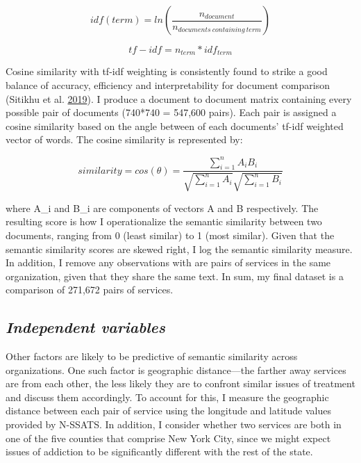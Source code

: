 \documentclass[
  12pt,
]{article}
\begin{document}
\vspace{12pt}

\[idf(term) = ln(\frac{n_{document}}{n_{documents\ containing\ term}})\]

\vspace{12pt}

\[tf-idf = n_{term} * idf_{term}\]

\vspace{12pt}

Cosine similarity with tf-idf weighting is consistently found to strike a good balance of accuracy, efficiency and interpretability for document comparison (Sitikhu et al. \protect\hyperlink{ref-sitikhu2019}{2019}). I produce a document to document matrix containing every possible pair of documents (740*740 = 547,600 pairs). Each pair is assigned a cosine similarity based on the angle between of each documents' tf-idf weighted vector of words. The cosine similarity is represented by:

\vspace{12pt}

\[similarity = cos(\theta) = \frac{\sum_{i=1}^{n}A_iB_i}{\sqrt{\sum_{i=1}^{n}A_i}\sqrt{\sum_{i=1}^{n}B_i}}\]

\vspace{12pt}

where A\_i and B\_i are components of vectors A and B respectively. The resulting score is how I operationalize the semantic similarity between two documents, ranging from 0 (least similar) to 1 (most similar). Given that the semantic similarity scores are skewed right, I log the semantic similarity measure. In addition, I remove any observations with are pairs of services in the same organization, given that they share the same text. In sum, my final dataset is a comparison of 271,672 pairs of services.

\hypertarget{independent-variables}{%
\subsection{\texorpdfstring{\emph{Independent variables}}{Independent variables}}\label{independent-variables}}

Other factors are likely to be predictive of semantic similarity across organizations. One such factor is geographic distance---the farther away services are from each other, the less likely they are to confront similar issues of treatment and discuss them accordingly. To account for this, I measure the geographic distance between each pair of service using the longitude and latitude values provided by N-SSATS. In addition, I consider whether two services are both in one of the five counties that comprise New York City, since we might expect issues of addiction to be significantly different with the rest of the state.
\end{document}
